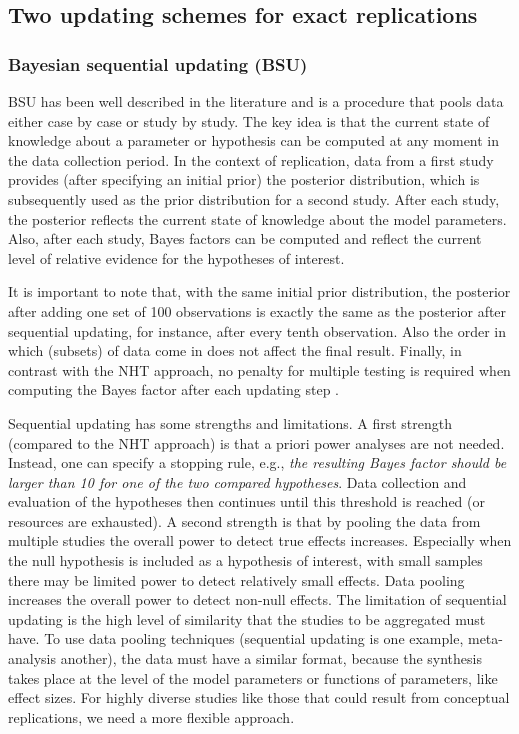 \documentclass[11pt,reqno]{article}
\begin{document}
\subsection{Two updating schemes for exact replications}\label{Twomethods}

\subsubsection{Bayesian sequential updating (BSU)}
BSU has been well described in the literature \autocite[e.g.,][]{schonbrodt_sequential_2017, verhagen_bayesian_2014} and is a procedure that pools data either case by case or study by study. The key idea is that the current state of knowledge about a parameter or hypothesis can be computed at any moment in the data collection period. In the context of replication, data from a first study provides (after specifying an initial prior) the posterior distribution, which is subsequently used as the prior distribution for a second study. After each study, the posterior reflects the current state of knowledge about the model parameters. Also, after each study, Bayes factors can be computed and reflect the current level of relative evidence for the hypotheses of interest.

It is important to note that, with the same initial prior distribution, the posterior after adding one set of 100 observations is exactly the same as the posterior after sequential updating, for instance, after every tenth observation. Also the order in which (subsets) of data come in does not affect the final result. Finally, in contrast with the NHT approach, no penalty for multiple testing is required when computing the Bayes factor after each updating step \autocite{schonbrodt_sequential_2017}.

Sequential updating has some strengths and limitations. A first strength (compared to the NHT approach) is that a priori power analyses are not needed. Instead, one can specify a stopping rule, e.g., \textit{the resulting Bayes factor should be larger than 10 for one of the two compared hypotheses}. Data collection and evaluation of the hypotheses then continues until this threshold is reached (or resources are exhausted). A second strength is that by pooling the data from multiple studies the overall power to detect true effects increases. Especially when the null hypothesis is included as a hypothesis of interest, with small samples there may be limited power to detect relatively small effects. Data pooling increases the overall power to detect non-null effects.
The limitation of sequential updating is the high level of similarity that the studies to be aggregated must have. To use data pooling techniques (sequential updating is one example, meta-analysis another), the data must have a similar format, because the synthesis takes place at the level of the model parameters or functions of parameters, like effect sizes. For highly diverse studies like those that could result from conceptual replications, we need a more flexible approach.
\end{document}
